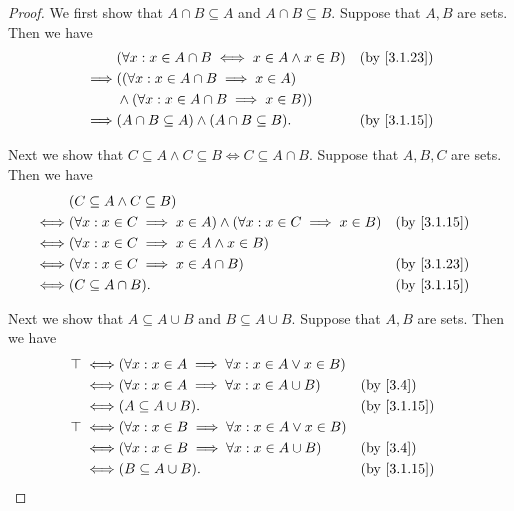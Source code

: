 \begin{proof}
	We first show that \(A \cap B \subseteq A\) and \(A \cap B \subseteq B\).
	Suppose that \(A, B\) are sets.
	Then we have
	\begin{align*}
		         & (\forall x : x \in A \cap B \iff x \in A \land x \in B) &  & \by{3.1.23} \\
		\implies & ((\forall x : x \in A \cap B \implies x \in A)                           \\
		         & \land (\forall x : x \in A \cap B \implies x \in B))                     \\
		\implies & (A \cap B \subseteq A) \land (A \cap B \subseteq B).    &  & \by{3.1.15}
	\end{align*}

	Next we show that \(C \subseteq A \land C \subseteq B \iff C \subseteq A \cap B\).
	Suppose that \(A, B, C\) are sets.
	Then we have
	\begin{align*}
		     & (C \subseteq A \land C \subseteq B)                                                                  \\
		\iff & (\forall x : x \in C \implies x \in A) \land (\forall x : x \in C \implies x \in B) &  & \by{3.1.15} \\
		\iff & (\forall x : x \in C \implies x \in A \land x \in B)                                                 \\
		\iff & (\forall x : x \in C \implies x \in A \cap B)                                       &  & \by{3.1.23} \\
		\iff & (C \subseteq A \cap B).                                                             &  & \by{3.1.15}
	\end{align*}

	Next we show that \(A \subseteq A \cup B\) and \(B \subseteq A \cup B\).
	Suppose that \(A, B\) are sets.
	Then we have
	\begin{align*}
		\top \iff & (\forall x : x \in A \implies \forall x : x \in A \lor x \in B)                  \\
		\iff      & (\forall x : x \in A \implies \forall x : x \in A \cup B)       &  & \by{3.4}    \\
		\iff      & (A \subseteq A \cup B).                                         &  & \by{3.1.15} \\
		\top \iff & (\forall x : x \in B \implies \forall x : x \in A \lor x \in B)                  \\
		\iff      & (\forall x : x \in B \implies \forall x : x \in A \cup B)       &  & \by{3.4}    \\
		\iff      & (B \subseteq A \cup B).                                         &  & \by{3.1.15}
	\end{align*}


\end{proof}
